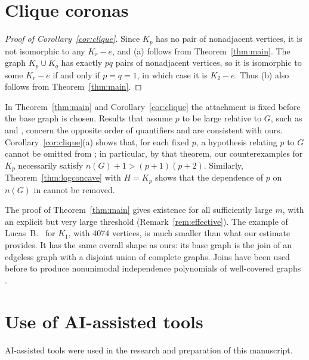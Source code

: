 \documentclass[11pt]{amsart}
\theoremstyle{remark}
\numberwithin{equation}{section}
\begin{document}
\section{Clique coronas}\label{sec:clique}

\begin{proof}[Proof of Corollary~\ref{cor:clique}]
Since $K_p$ has no pair of nonadjacent vertices, it is not isomorphic to any $K_r-e$, and (a) follows from Theorem~\ref{thm:main}. The graph $K_p\cup K_q$ has exactly $pq$ pairs of nonadjacent vertices, so it is isomorphic to some $K_r-e$ if and only if $p=q=1$, in which case it is $K_2-e$. Thus (b) also follows from Theorem~\ref{thm:main}.
\end{proof}

In Theorem~\ref{thm:main} and Corollary~\ref{cor:clique} the attachment is fixed before the base graph is chosen. Results that assume $p$ to be large relative to $G$, such as \cite[Corollary~3.10]{HLMP-Wp} and \cite[Theorem~4.6]{HLMP-clique}, concern the opposite order of quantifiers and are consistent with ours. Corollary~\ref{cor:clique}(a) shows that, for each fixed $p$, a hypothesis relating $p$ to $G$ cannot be omitted from \cite[Theorem~4.6]{HLMP-clique}; in particular, by that theorem, our counterexamples for $K_p$ necessarily satisfy $n(G)+1>(p+1)(p+2)$. Similarly, Theorem~\ref{thm:logconcave} with $H=K_p$ shows that the dependence of $p$ on $n(G)$ in \cite[Corollary~3.10]{HLMP-Wp} cannot be removed.

The proof of Theorem~\ref{thm:main} gives existence for all sufficiently large $m$, with an explicit but very large threshold (Remark~\ref{rem:effective}). The example of Lucas~B.~\cite{LucasB} for $K_1$, with $4074$ vertices, is much smaller than what our estimate provides. It has the same overall shape as ours: its base graph is the join of an edgeless graph with a disjoint union of complete graphs. Joins have been used before to produce nonunimodal independence polynomials of well-covered graphs \cite{LM06}.

\section*{Use of AI-assisted tools}

AI-assisted tools were used in the research and preparation of this manuscript.
\end{document}
